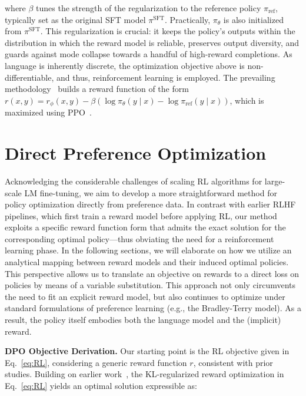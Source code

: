 where $\beta$ tunes the strength of the regularization to the reference policy $\pi_\text{ref}$, typically set as the original SFT model $\pi^\text{SFT}$. Practically, $\pi_\theta$ is also initialized from $\pi^\text{SFT}$. This regularization is crucial: it keeps the policy’s outputs within the distribution in which the reward model is reliable, preserves output diversity, and guards against mode collapse towards a handful of high-reward completions. As language is inherently discrete, the optimization objective above is non-differentiable, and thus, reinforcement learning is employed. The prevailing methodology~\citep{ziegler2020finetuning, stiennon2022learning, bai2022training, ouyang2022training} builds a reward function of the form ${r(x, y) = r_{\phi}(x, y) -\beta (\log \pi_{\theta}(y\mid x) - \log \pi_\text{ref}(y\mid x))}$, which is maximized using PPO~\cite{schulman2017proximal}.

\section{Direct Preference Optimization}\label{sec:DPO}

Acknowledging the considerable challenges of scaling RL algorithms for large-scale LM fine-tuning, we aim to develop a more straightforward method for policy optimization directly from preference data. In contrast with earlier RLHF pipelines, which first train a reward model before applying RL, our method exploits a specific reward function form that admits the exact solution for the corresponding optimal policy—thus obviating the need for a reinforcement learning phase. In the following sections, we will elaborate on how we utilize an analytical mapping between reward models and their induced optimal policies. This perspective allows us to translate an objective on rewards to a direct loss on policies by means of a variable substitution. This approach not only circumvents the need to fit an explicit reward model, but also continues to optimize under standard formulations of preference learning (e.g., the Bradley-Terry model). As a result, the policy itself embodies both the language model and the (implicit) reward.

\textbf{DPO Objective Derivation.} Our starting point is the RL objective given in Eq.~\ref{eq:RL}, considering a generic reward function $r$, consistent with prior studies. Building on earlier work~\citep{peters2007reinforcement, peng2019advantage, korbak2022reinforcement, go2023aligning}, the KL-regularized reward optimization in Eq.~\ref{eq:RL} yields an optimal solution expressible as:

